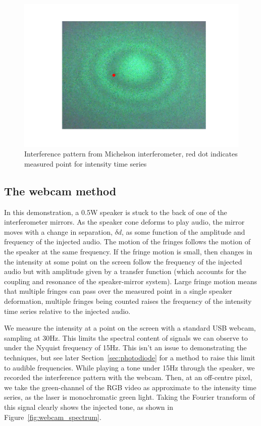 \documentclass[prb,preprint]{revtex4-1}
\begin{document}
\begin{figure}
	\includegraphics[width=\textwidth]{webcam_still0.pdf}
	\caption{Interference pattern from Michelson interferometer, red dot indicates measured point for intensity time series}
	\label{fig:interference_pattern}
\end{figure}



\subsection{The webcam method}

In this demonstration, a 0.5W speaker is stuck to the back of one of the interferometer mirrors. As the speaker cone deforms to play audio, the mirror moves with a change in separation, $\delta d$, as some function of the amplitude and frequency of the injected audio. The motion of the fringes follows the motion of the speaker at the same frequency. If the fringe motion is small, then changes in the intensity at some point on the screen follow the frequency of the injected audio but with amplitude given by a transfer function (which accounts for the coupling and resonance of the speaker-mirror system). Large fringe motion means that multiple fringes can pass over the measured point in a single speaker deformation, multiple fringes being counted raises the frequency of the intensity time series relative to the injected audio.


We measure the intensity at a point on the screen with a standard USB webcam, sampling at 30Hz. This limits the spectral content of signals we can observe to under the Nyquist frequency of 15Hz. This isn’t an issue to demonstrating the techniques, but see later Section~\ref{sec:photodiode} for a method to raise this limit to audible frequencies.	While playing a tone under 15Hz through the speaker, we recorded the interference pattern with the webcam. Then, at an off-centre pixel, we take the green-channel of the RGB video as approximate to the intensity time series, as the laser is monochromatic green light. Taking the Fourier transform of this signal clearly shows the injected tone, as shown in Figure~\ref{fig:webcam_spectrum}.
\end{document}
